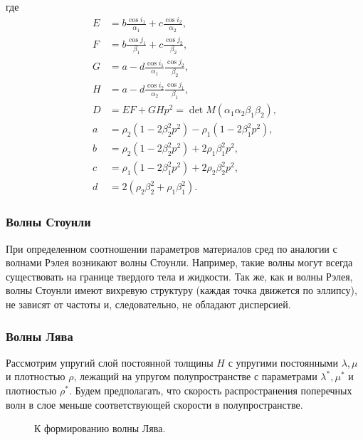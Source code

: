 где
\begin{align}
E &= b \frac{\cos{i_1}}{\alpha_1} + c \frac{\cos{i_2}}{\alpha_2}, \nonumber\\
F &= b \frac{\cos{j_1}}{\beta_1} + c \frac{\cos{j_2}}{\beta_2}, \nonumber\\
G &= a - d \frac{\cos{i_1}}{\alpha_1} \frac{\cos{j_2}}{\beta_2}, \nonumber\\
H &= a - d \frac{\cos{i_2}}{\alpha_2} \frac{\cos{j_1}}{\beta_1}, \nonumber\\
D &= EF + GHp^2 = \det{M}(\alpha_1 \alpha_2 \beta_1 \beta_2), \nonumber\\
a &= \rho_2 (1 - 2 \beta_2^2 p^2) - \rho_1 (1 - 2 \beta_1^2 p^2), \nonumber\\
b &= \rho_2 (1 - 2 \beta_2^2 p^2) + 2 \rho_1 \beta_1^2 p^2, \nonumber\\
c &= \rho_1 (1 - 2 \beta_1^2 p^2) + 2 \rho_2 \beta_2^2 p^2, \nonumber\\
d &= 2 (\rho_2 \beta_2^2 + \rho_1 \beta_1^2).
\end{align}


\subsubsection{Волны Стоунли}

При определенном соотношении параметров материалов сред по аналогии с волнами Рэлея возникают волны Стоунли. Например, такие волны могут всегда существовать на границе твердого тела и жидкости. Так же, как и волны Рэлея, волны Стоунли имеют вихревую структуру (каждая точка движется по эллипсу), не зависят от частоты и, следовательно, не обладают дисперсией. 


\subsubsection{Волны Лява}

Рассмотрим упругий слой постоянной толщины $H$ с упругими постоянными $\lambda, \mu$ и плотностью $\rho$, лежащий на упругом полупространстве с параметрами $\lambda^*, \mu^*$ и плотностью $\rho^*$. Будем предполагать, что скорость распространения поперечных волн в слое меньше соответствующей скорости в полупространстве. 

\begin{figure}[h]
\caption{К формированию волны Лява.}
\end{figure}

